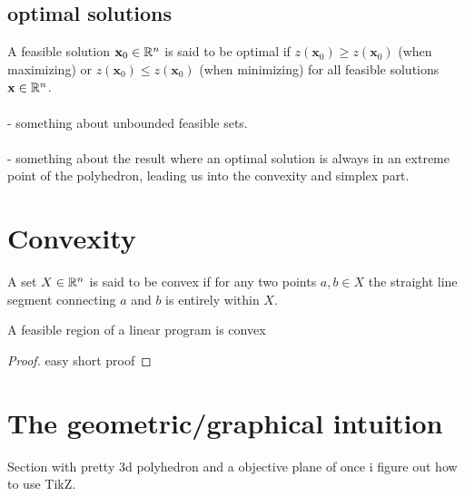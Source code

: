 \subsection{optimal solutions}
A feasible solution $\textbf{x}_0 \in \mathbb{R}^n$ is said to be optimal if $z(\textbf{x}_0) \geq z(\textbf{x}_0)$ (when maximizing) or $z(\textbf{x}_0) \leq z(\textbf{x}_0)$ (when minimizing) for all feasible solutions $\textbf{x} \in \mathbb{R}^n$.\\\\
- something about unbounded feasible sets.\\\\
- something about the result where an optimal solution is always in an extreme point of the polyhedron, leading us into the convexity and simplex part.
\section{Convexity}
\begin{definition}\label{convex}
A set $X \in \mathbb{R}^n$ is said to be convex if for any two points $a, b \in X$ the straight line segment 
connecting $a$ and $b$ is entirely within $X$.
\end{definition}
\begin{theorem}
A feasible region of a linear program is convex
\begin{proof}
easy short proof
\end{proof}
\end{theorem}
\section{The geometric/graphical intuition}
Section with pretty 3d polyhedron and a objective plane of  once i figure out how to use TikZ.  
